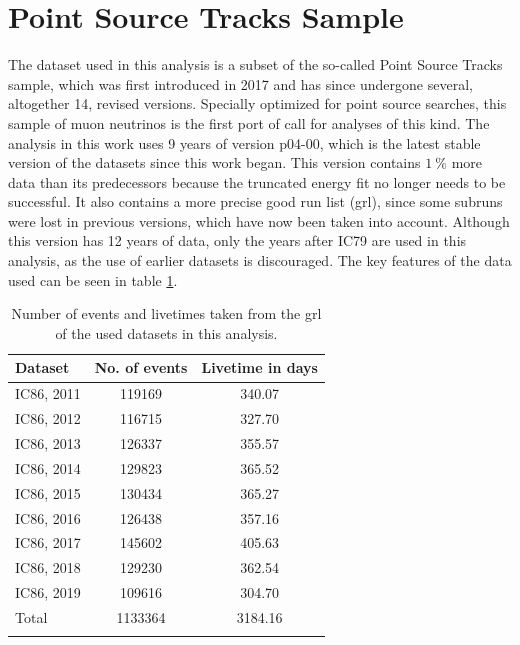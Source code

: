 \section{Point Source Tracks Sample} \label{sec:data}
%
%
%

The dataset used in this analysis is a subset of the so-called Point Source Tracks sample, which was first introduced in 2017 and has since undergone several, altogether 14, revised versions.
Specially optimized for point source searches, this sample of muon neutrinos is the first port of call for analyses of this kind.
The analysis in this work uses 9 years of version p04-00, which is the latest stable version of the datasets since this work began.
This version contains $\SI{1}{\percent}$ more data than its predecessors because the truncated energy fit no longer needs to be successful.
It also contains a more precise good run list (grl), since some subruns were lost in previous versions, which have now been taken into account.
Although this version has 12 years of data, only the years after IC79 are used in this analysis, as the use of earlier datasets is discouraged. \cite{ps_tracks_v4_presentation}
The key features of the data used can be seen in table \ref{tab:data}.

\begin{table}
  \centering
  \caption{Number of events and livetimes taken from the grl of the used datasets in this analysis.}
  \begin{tabular}{lcc}
    \toprule
    Dataset & No. of events & Livetime in days \\
    \toprule
    IC86, 2011 & 119169 & 340.07 \\
    IC86, 2012 & 116715 & 327.70 \\
    IC86, 2013 & 126337 & 355.57 \\
    IC86, 2014 & 129823 & 365.52 \\
    IC86, 2015 & 130434 & 365.27 \\
    IC86, 2016 & 126438 & 357.16 \\
    IC86, 2017 & 145602 & 405.63 \\
    IC86, 2018 & 129230 & 362.54 \\
    IC86, 2019 & 109616 & 304.70 \\
    \hline
    Total & 1133364 & 3184.16 \\
    \toprule
    \label{tab:data}
  \end{tabular}
\end{table}

